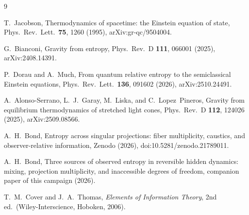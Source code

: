 \documentclass[aps,pre,reprint,nofootinbib]{revtex4-2}
\begin{document}
\begin{thebibliography}{9}

T.~Jacobson,
Thermodynamics of spacetime: the Einstein equation of state,
Phys.\ Rev.\ Lett.\ \textbf{75}, 1260 (1995),
arXiv:gr-qc/9504004.

G.~Bianconi,
Gravity from entropy,
Phys.\ Rev.\ D \textbf{111}, 066001 (2025),
arXiv:2408.14391.

P.~Dorau and A.~Much,
From quantum relative entropy to the semiclassical Einstein equations,
Phys.\ Rev.\ Lett.\ \textbf{136}, 091602 (2026),
arXiv:2510.24491.

A.~Alonso-Serrano, L.~J.~Garay, M.~Liska, and C.~Lopez~Pineros,
Gravity from equilibrium thermodynamics of stretched light cones,
Phys.\ Rev.\ D \textbf{112}, 124026 (2025),
arXiv:2509.08566.

A.~H.~Bond,
Entropy across singular projections: fiber multiplicity, caustics, and
observer-relative information,
Zenodo (2026), doi:10.5281/zenodo.21789011.

A.~H.~Bond,
Three sources of observed entropy in reversible hidden dynamics:
mixing, projection multiplicity, and inaccessible degrees of freedom,
companion paper of this campaign (2026).

T.~M.~Cover and J.~A.~Thomas,
\emph{Elements of Information Theory}, 2nd ed.\
(Wiley-Interscience, Hoboken, 2006).

\end{thebibliography}
\end{document}
